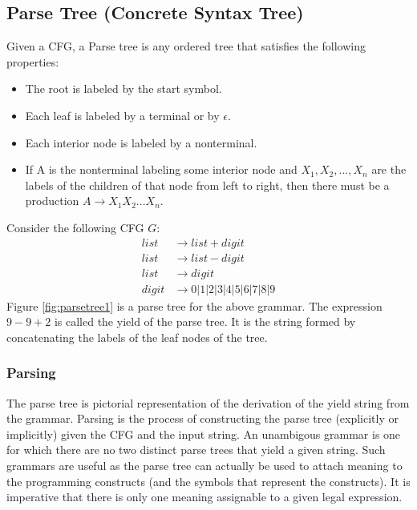\documentclass[12pt]{article}
\begin{document}
	\subsection{Parse Tree (Concrete Syntax Tree)}
	Given a CFG, a Parse tree is any ordered tree that satisfies the following properties:
	\begin{itemize}
		\item The root is labeled by the start symbol.
		\item Each leaf is labeled by a terminal or by $\epsilon$.
		\item Each interior node is labeled by a nonterminal.
		\item If A is the nonterminal labeling some interior node and $ X_{1}, X_{2},..., X_n $ are the labels of the children of that node from left to right, then there must be a production $ A \rightarrow X_{1}X_{2}...X_n $.
	\end{itemize}

	Consider the following CFG $G$:
	\begin{align*}
		list &\rightarrow list + digit\\
		list &\rightarrow list - digit\\
		list &\rightarrow digit\\
		digit &\rightarrow 0 | 1 | 2 | 3 | 4 | 5 | 6 | 7 | 8 | 9
	\end{align*}
	Figure \ref{fig:parsetree1} is a parse tree for the above grammar. The expression \texttt{$9 - 9 + 2$} is called the yield of the parse tree. It is the string formed by concatenating the labels of the leaf nodes of the tree.

	\subsubsection{Parsing}
		The parse tree is  pictorial representation of the derivation of the yield string from the grammar. Parsing is the process of constructing the parse tree (explicitly or implicitly) given the CFG and the input string. An unambigous grammar is one for which there are no two distinct parse trees that yield a given string. Such grammars are useful as the parse tree can actually be used to attach meaning to the programming constructs (and the symbols that represent the constructs). It is imperative that there is only one meaning assignable to a given legal expression.
\end{document}
